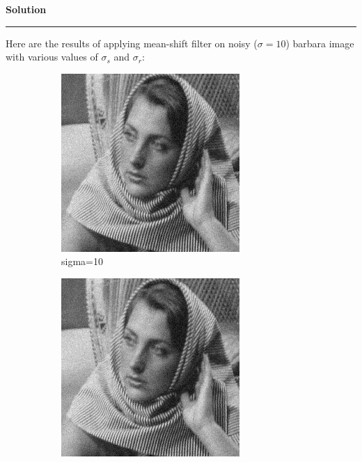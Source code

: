 \documentclass[a4paper]{article}
\newenvironment{solution}[2][]{%
    \begin{mdframed}[linecolor=green!60!black, linewidth=2pt, roundcorner=10pt, backgroundcolor=green!5!white, skipabove=12pt, skipbelow=12pt]%
        \textbf{\large #2} %
        \par\noindent\rule{\textwidth}{0.4pt} %
        \vspace{0.5em} %
}{%
    \end{mdframed}%
}
\begin{document}
\begin{solution}{Solution}
Here are the results of applying mean-shift filter on noisy ($\sigma = 10$) barbara image with various values of $\sigma_s$ and $\sigma_r$:
\begin{figure}[H]
    \centering
    \begin{subfigure}[b]{0.24\textwidth}
        \centering
        \includegraphics[width=\textwidth]{../images/noisy_barbara256_sigma_10.png}
        \caption{sigma=10}
        \label{Noisy }
    \end{subfigure}
    \begin{subfigure}[b]{0.24\textwidth}
        \centering
        \includegraphics[width=\textwidth]{../images/filtered_barbara256_meanshift_sigma_10_sigma_s_2_sigma_r_2.png}

\end{subfigure}
\end{figure}
\end{solution}
\end{document}
